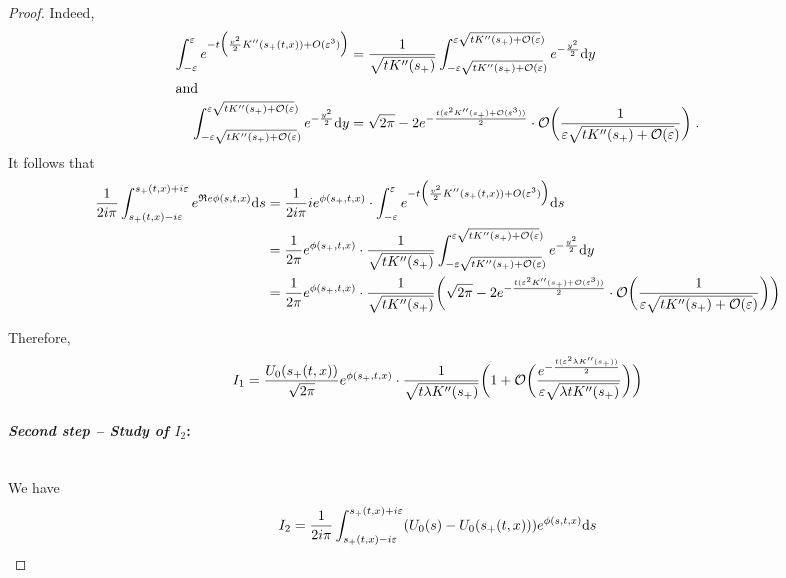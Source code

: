 \documentclass[11pt]{amsart}
\renewcommand{\Re}{\mathfrak{R}e}
\begin{document}
\begin{proof}
Indeed, 
\begin{align*}
    \int_{- \varepsilon}^{\varepsilon} e^{- t \Big(\frac{v^2}{2} K''(s_+(t,x)) + O(\varepsilon^3)\Big)} 
    &= 
     \frac{1}{\sqrt{tK''(s_+)}} \int_{- \varepsilon \sqrt{tK''(s_+) + \mathcal{O}(\varepsilon})}^{\varepsilon \sqrt{tK''(s_+) + \mathcal{O}(\varepsilon})} e^{- \frac{y^2}{2}}\mathrm dy \\
     \intertext{and}
     \int_{- \varepsilon \sqrt{tK''(s_+) + \mathcal{O}(\varepsilon})}^{\varepsilon \sqrt{tK''(s_+) + \mathcal{O}(\varepsilon})} e^{- \frac{y^2}{2}}\mathrm dy &= 
    \sqrt{2\pi} - 2 e^{-\frac{t(\varepsilon^2 K''(s_+) + \mathcal{O}(\varepsilon^3))}{2}} \cdot \mathcal{O}\bigg(\frac{1 }{\varepsilon \sqrt{tK''(s_+) + \mathcal{O}(\varepsilon})}\bigg)
    \; .
\end{align*}
It follows that 
    \begin{align*}
     \frac{1}{2i\pi}   \int_{s_+(t,x) - i\varepsilon}^{s_+(t,x) + i\varepsilon} e^{\Re \phi(s,t,x)} \ds 
     &= 
     \frac{1}{2i\pi} i e^{\phi(s_+, t, x)} \cdot \int_{- \varepsilon}^{\varepsilon} e^{- t \Big(\frac{v^2}{2} K''(s_+(t,x)) + O(\varepsilon^3)\Big)} \ds  \\
     &= 
      \frac{1}{2\pi} e^{\phi(s_+, t, x)} \cdot \frac{1}{\sqrt{tK''(s_+)}} \int_{- \varepsilon \sqrt{tK''(s_+) + \Ocal(\varepsilon})}^{\varepsilon \sqrt{tK''(s_+) + \Ocal(\varepsilon})} e^{- \frac{y^2}{2}}\dy \\
     &=
    \frac{1}{2\pi} e^{\phi(s_+, t, x)} \cdot \frac{1}{\sqrt{tK''(s_+)}} \bigg( 
    \sqrt{2\pi} - 2 e^{-\frac{t(\varepsilon^2 K''(s_+) + \Ocal(\varepsilon^3))}{2}} \cdot \Ocal\bigg(\frac{1 }{\varepsilon \sqrt{tK''(s_+) + \Ocal(\varepsilon})}\bigg) \bigg) \\
    \end{align*}
    
Therefore, 
    \begin{equation}
    I_1 = \frac{U_0(s_+(t,x))}{\sqrt{2\pi}} e^{\phi(s_+, t, x)} \cdot \frac{1}{\sqrt{t \lambda K''(s_+)}} \bigg( 
    1 + \mathcal{O}\bigg(\frac{e^{-\frac{t(\varepsilon^2 \lambda K''(s_+))}{2}} }{\varepsilon \sqrt{\lambda tK''(s_+)}}\bigg) \bigg)\\
    \end{equation}

\medskip
\paragraph{\textit{Second step -- Study of $I_2$}:}\mbox{}\\
We have 
    \begin{equation*}
        I_2 = \frac{1}{2i \pi} \int_{s_+(t,x) - i\varepsilon}^{s_+(t,x) + i\varepsilon} (U_0(s) -  U_0(s_+(t,x)))  e^{\phi(s,t,x)} \mathrm ds 
    \end{equation*}
    

\end{proof}
\end{document}
